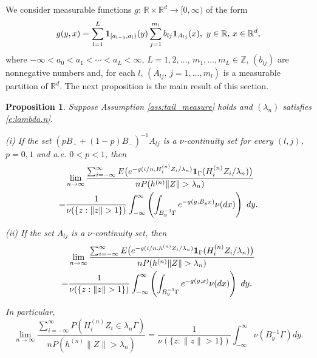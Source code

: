 \documentclass[11pt,reqno]{amsart}
\numberwithin{equation}{section}
\newtheorem{proposition}{Proposition}
\theoremstyle{definition}
\theoremstyle{remark}
\theoremstyle{definition}
\newcommand{\R}{\mathbb{R}}
\newcommand{\ZZ}{\mathbb{Z}}
\newcommand{\bbz}{\ZZ}
\newcommand{\one}{{\bf 1}}
\begin{document}
We consider measurable functions $g:\, \R\times \R^d\to [0,\infty)$ of
the form 
\begin{equation} \label{e:simple.g}
g(y,x)= \sum_{l=1}^L \one_{[a_{l-1},a_l)}(y) \sum_{j=1}^{m_l} b_{lj}
\one_{A_{lj}}(x), \ y\in\R, \, x\in\R^d,
\end{equation} 
where $-\infty<a_0<a_1<\cdots <a_L<\infty, \, L=1,2,\ldots$,
$m_1,\ldots, m_L\in\bbz$, $(b_{lj})$ are nonnegative numbers and, for
each $l$, 
$(A_{lj}, \, j=1,\ldots, m_l)$ is a measurable partition of $\R^d$. The next proposition
is the main result of this section.





\begin{proposition} \label{prop:int_approx} 
 Suppose Assumption
  \ref{ass:tail_measure} holds and $(\lambda_n)$ satisfies
  \eqref{e:lambda.n}.

 (i)   If the set
  $(pB_++(1-p)B_-)^{-1} A_{lj}$ is a 
  $\nu$-continuity set for every $(l,j)$, $p=0,1$ and a.e. $0<p< 1$, then
   \begin{align}\label{eq:limit_sum_gen}
&\lim_{n\to\infty} \frac{\sum_{i = -\infty}^\infty E\bigl( e^{-g(i/n,
    H_i^{(n)} Z_i/\lambda_n)} \one_{\Gamma}(H_i^{(n)} Z_i/\lambda_n)\bigr) }
{n P(h^{(n)}\|Z\| > \lambda_n)}\\
\notag =&\frac{1}{\nu(\{z: \|z\|> 1\})}  \int_{-\infty}^\infty \left( 
\int_{B_y^{-1}\Gamma} e^{-g(y,B_yx)} \nu (dx)\right) \ dy.
   \end{align}

 (ii)     If the set $A_{lj}$ is a $\nu$-continuity set, then
 \begin{align}\label{eq:limit_sum_gen1}
&\lim_{n\to\infty} \frac{\sum_{i = -\infty}^\infty E\bigl( e^{-g(i/n,
    h^{(n)} Z_i/\lambda_n)} \one_{\Gamma}(H_i^{(n)} Z_i/\lambda_n)\bigr) }
{n P(h^{(n)}\|Z\| > \lambda_n)}\\
\notag =&\frac{1}{\nu(\{z: \|z\|> 1\})}  \int_{-\infty}^\infty \left( 
\int_{B_y^{-1}\Gamma} e^{-g(y,x)} \nu (dx)\right) \ dy.
 \end{align}

 In particular,
 \begin{equation}\label{eq:limit_sum_tot}
\lim_{n\to\infty} \frac{\sum_{i = -\infty}^\infty 
    P (H_i^{(n)} Z_i\in\lambda_n\Gamma)}
{n P(h^{(n)}\|Z\| > \lambda_n)}
=\frac{1}{\nu(\{z: \|z\|> 1\})}  \int_{-\infty}^\infty \nu(B_y^{-1}\Gamma)  dy.
\end{equation}
 \end{proposition}
\end{document}
